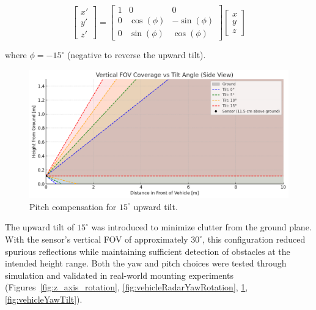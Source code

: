 \[
\begin{bmatrix}
x' \\ y' \\ z'
\end{bmatrix}
=
\begin{bmatrix}
1 & 0 & 0 \\
0 & \cos(\phi) & -\sin(\phi) \\
0 & \sin(\phi) & \cos(\phi)
\end{bmatrix}
\begin{bmatrix}
x \\ y \\ z
\end{bmatrix}
\]

where $\phi = -15^\circ$ (negative to reverse the upward tilt).

\begin{figure}[!htbp]
    \centering
    \includegraphics[width=0.8\linewidth]{images/TiltSensor.png}
    \caption{Pitch compensation for $15^\circ$ upward tilt.}
    \label{fig:x_axis_rotation}
\end{figure}

The upward tilt of $15^\circ$ was introduced to minimize clutter from the ground plane.  
With the sensor's vertical FOV of approximately $30^\circ$, this configuration reduced spurious reflections while maintaining sufficient detection of obstacles at the intended height range.  
Both the yaw and pitch choices were tested through simulation and validated in real-world mounting experiments (Figures~\ref{fig:z_axis_rotation}, \ref{fig:vehicleRadarYawRotation}, \ref{fig:x_axis_rotation}, \ref{fig:vehicleYawTilt}).

